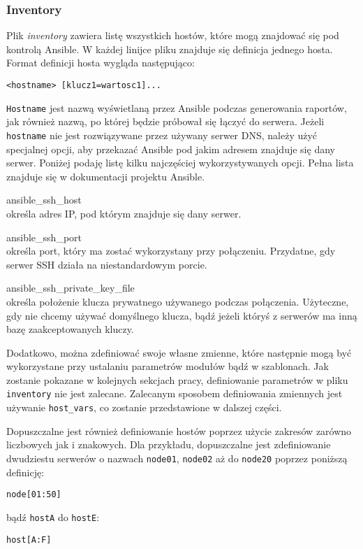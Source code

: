\subsubsection{Inventory}
Plik \textit{inventory} zawiera listę wszystkich hostów, które mogą znajdować się pod kontrolą Ansible.  
W każdej linijce pliku znajduje się definicja jednego hosta.
Format definicji hosta wygląda następująco:
\begin{lstlisting}
<hostname> [klucz1=wartosc1]...
\end{lstlisting}
\texttt{Hostname} jest nazwą wyświetlaną przez Ansible podczas generowania raportów, jak również nazwą, po której będzie próbował się łączyć do serwera.
Jeżeli \texttt{hostname} nie jest rozwiązywane przez używany serwer DNS, należy użyć specjalnej opcji, aby przekazać Ansible pod jakim adresem znajduje się dany serwer.
Poniżej podaję listę kilku najczęściej wykorzystywanych opcji. Pełna lista znajduje się w dokumentacji projektu Ansible.
\begin{description}
\item{ansible\_ssh\_host}\\
	określa adres IP, pod którym znajduje się dany serwer.	
\item{ansible\_ssh\_port}\\
	określa port, który ma zostać wykorzystany przy połączeniu. Przydatne, gdy serwer SSH działa na niestandardowym porcie.
\item{ansible\_ssh\_private\_key\_file}\\
	określa położenie klucza prywatnego używanego podczas połączenia. Użyteczne, gdy nie chcemy używać domyślnego klucza, bądź jeżeli któryś z serwerów ma inną bazę zaakceptowanych kluczy.
\end{description}
Dodatkowo, można zdefiniować swoje własne zmienne, które następnie mogą być wykorzystane przy ustalaniu parametrów modułów bądź w szablonach.  
Jak zostanie pokazane w kolejnych sekcjach pracy, definiowanie parametrów w pliku \texttt{inventory} nie jest zalecane.
Zalecanym sposobem definiowania zmiennych jest używanie \texttt{host\_vars}, co zostanie przedstawione w dalszej części.

Dopuszczalne jest również definiowanie hostów poprzez użycie zakresów zarówno liczbowych jak i znakowych.
Dla przykładu, dopuszczalne jest zdefiniowanie dwudziestu serwerów o nazwach \texttt{node01}, \texttt{node02} aż do \texttt{node20} poprzez poniższą definicję:
\begin{lstlisting}
node[01:50]
\end{lstlisting}
bądź \texttt{hostA} do \texttt{hostE}:
\begin{lstlisting}
host[A:F]
\end{lstlisting}


